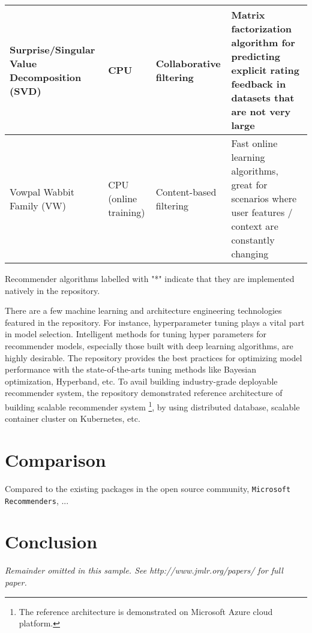 \documentclass[twoside,11pt]{article}
\begin{document}
\begin{adjustbox}{angle=90}
\begin{threeparttable}
\begin{tabular}{|p{5cm}|p{2cm}|p{4cm}|p{6cm}|}
    \hline
    Surprise/Singular Value Decomposition (SVD) & CPU & Collaborative filtering & Matrix factorization algorithm for predicting explicit rating feedback in datasets that are not very large \\
    \hline
    Vowpal Wabbit Family (VW) & CPU (online training) & Content-based filtering & Fast online learning algorithms, great for scenarios where user features / context are constantly changing \\
    \hline
    \end{tabular}
    \begin{tablenotes}
      \scriptsize
      \item Recommender algorithms labelled with "*" indicate that they are implemented natively in the repository.
    \end{tablenotes}
  \end{threeparttable}
\end{adjustbox}

There are a few machine learning and architecture engineering technologies featured in the repository. For instance, hyperparameter tuning plays a vital part in model selection. Intelligent methods for tuning hyper parameters for recommender models, especially those built with deep learning algorithms, are highly desirable. The repository provides the best practices for optimizing model performance with the state-of-the-arts tuning methods like Bayesian optimization, Hyperband, etc. \citep{pelikan1999boa,li2016hyperband} To avail building industry-grade deployable recommender system, the repository demonstrated reference architecture of building scalable recommender system \footnote{The reference architecture is demonstrated on Microsoft Azure cloud platform.}, by using distributed database, scalable container cluster on Kubernetes, etc.

\section{Comparison}
Compared to the existing packages in the open source community, \verb|Microsoft Recommenders|, ...  

\section{Conclusion}

{\noindent \em Remainder omitted in this sample. See http://www.jmlr.org/papers/ for full paper.}

\end{document}
